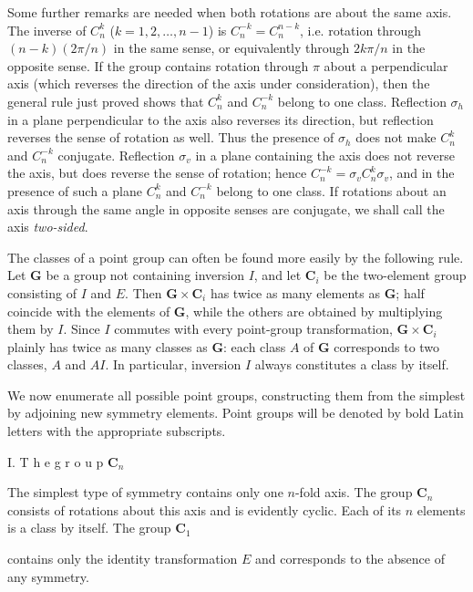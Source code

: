 Some further remarks are needed when both rotations are about the same axis. The inverse of $C_n^k$ ($k=1,2,\ldots,n-1$) is $C_n^{-k}=C_n^{n-k}$, i.e. rotation through $(n-k)(2\pi/n)$ in the same sense, or equivalently through $2k\pi/n$ in the opposite sense. If the group contains rotation through $\pi$ about a perpendicular axis (which reverses the direction of the axis under consideration), then the general rule just proved shows that $C_n^k$ and $C_n^{-k}$ belong to one class. Reflection $\sigma_h$ in a plane perpendicular to the axis also reverses its direction, but reflection reverses the sense of rotation as well. Thus the presence of $\sigma_h$ does not make $C_n^k$ and $C_n^{-k}$ conjugate. Reflection $\sigma_v$ in a plane containing the axis does not reverse the axis, but does reverse the sense of rotation; hence $C_n^{-k}=\sigma_vC_n^k\sigma_v$, and in the presence of such a plane $C_n^k$ and $C_n^{-k}$ belong to one class. If rotations about an axis through the same angle in opposite senses are conjugate, we shall call the axis \emph{two-sided}.

The classes of a point group can often be found more easily by the following rule. Let $\boldsymbol{G}$ be a group not containing inversion $I$, and let $\boldsymbol{C}_i$ be the two-element group consisting of $I$ and $E$. Then $\boldsymbol{G}\times\boldsymbol{C}_i$ has twice as many elements as $\boldsymbol{G}$; half coincide with the elements of $\boldsymbol{G}$, while the others are obtained by multiplying them by $I$. Since $I$ commutes with every point-group transformation, $\boldsymbol{G}\times\boldsymbol{C}_i$ plainly has twice as many classes as $\boldsymbol{G}$: each class $A$ of $\boldsymbol{G}$ corresponds to two classes, $A$ and $AI$. In particular, inversion $I$ always constitutes a class by itself.

We now enumerate all possible point groups, constructing them from the simplest by adjoining new symmetry elements. Point groups will be denoted by bold Latin letters with the appropriate subscripts.

\medskip
\noindent I. T h e  g r o u p $\boldsymbol{C}_n$

The simplest type of symmetry contains only one $n$-fold axis. The group $\boldsymbol{C}_n$ consists of rotations about this axis and is evidently cyclic. Each of its $n$ elements is a class by itself. The group $\boldsymbol{C}_1$

contains only the identity transformation $E$ and corresponds to the absence of any symmetry.

